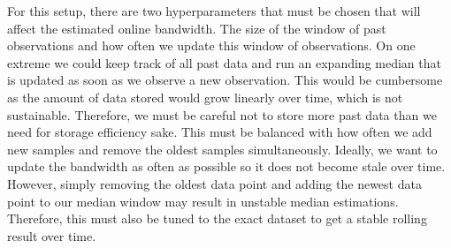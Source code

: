 For this setup, there are two hyperparameters that must be chosen that will affect the estimated online bandwidth. The size of the window of past observations and how often we update this window of observations. On one extreme we could keep track of all past data and run an expanding median that is updated as soon as we observe a new observation. This would be cumbersome as the amount of data stored would grow linearly over time, which is not sustainable. Therefore, we must be careful not to store more past data than we need for storage efficiency sake. This must be balanced with how often we add new samples and remove the oldest samples simultaneously. Ideally, we want to update the bandwidth as often as possible so it does not become stale over time. However, simply removing the oldest data point and adding the newest data point to our median window may result in unstable median estimations. Therefore, this must also be tuned to the exact dataset to get a stable rolling result over time.



